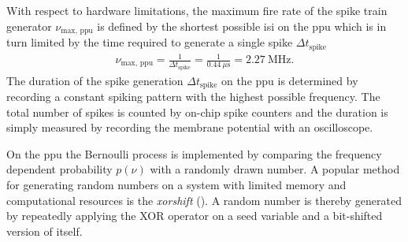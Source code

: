 With respect to hardware limitations, the maximum fire rate of the spike train generator $\nu_\text{max, ppu}$ is defined by the shortest possible \gls{isi} on the \gls{ppu} which is in turn limited by the time required to generate a single spike $\Delta t_\text{spike}$
\begin{align*}
\nu_\text{max, ppu} = \frac{1}{\Delta t_\text{spike}} = \frac{1}{\SI{0.44}{\mu \s}} = \SI{2.27}{\mega \Hz}.
\end{align*}
The duration of the spike generation $\Delta t_\text{spike}$ on the \gls{ppu} is determined by recording a constant spiking pattern with the highest possible frequency. The total number of spikes is counted by on-chip spike counters and the duration is simply measured by recording the membrane potential with an oscilloscope.


On the \gls{ppu} the Bernoulli process is implemented by comparing the frequency dependent probability $p(\nu)$ with a randomly drawn number. A popular method for generating random numbers on a system with limited memory and computational resources is the \emph{xorshift} (\citealp{marsaglia2003xorshift}). A random number is thereby generated by repeatedly applying the XOR operator on a seed variable and a bit-shifted version of itself. %



